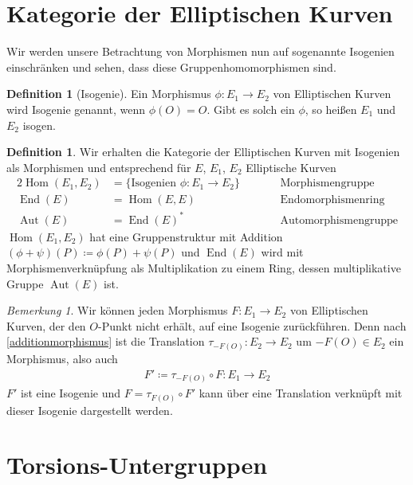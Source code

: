 \documentclass[english, german, parskip=half]{scrartcl}
\theoremstyle{definition}
\newtheorem{Definition}[Satz]{Definition}
\theoremstyle{remark}
\newtheorem{Bemerkung}[Satz]{Bemerkung}
\DeclareMathOperator{\Hom}{Hom}
\DeclareMathOperator{\End}{End}
\DeclareMathOperator{\Aut}{Aut}
\begin{document}



\section{Kategorie der Elliptischen Kurven}
Wir werden unsere Betrachtung von Morphismen nun auf sogenannte
Isogenien einschränken und sehen, dass diese Gruppenhomomorphismen
sind.

\begin{Definition}[Isogenie]
  Ein Morphismus $\phi\colon E_1\to E_2$ von Elliptischen Kurven wird
  Isogenie genannt, wenn $\phi(O)=O$.
  Gibt es solch ein $\phi$, so heißen $E_1$ und $E_2$ isogen.
\end{Definition}

\begin{Definition}
  Wir erhalten die Kategorie der Elliptischen Kurven mit Isogenien als
  Morphismen und entsprechend für $E$, $E_1$, $E_2$ Elliptische Kurven
  \begin{alignat*}{2}
    \Hom(E_1, E_2)&=\{\text{Isogenien }\phi\colon E_1\to E_2\}
    \qquad&&\text{Morphismengruppe}
    \\
    \End(E)&=\Hom(E,E)
    &&\text{Endomorphismenring}\\
    \Aut(E)&=\End(E)^*
    &&\text{Automorphismengruppe} 
  \end{alignat*}
  $\Hom(E_1, E_2)$ hat eine Gruppenstruktur mit Addition
  $(\phi+\psi)(P)\coloneqq \phi(P)+\psi(P)$ 
  und $\End(E)$ wird mit Morphismenverknüpfung als Multiplikation zu 
  einem Ring, dessen multiplikative Gruppe $\Aut(E)$ ist.
\end{Definition}

\begin{Bemerkung}
Wir können jeden Morphismus $F\colon E_1\to E_2$ von Elliptischen
Kurven, der den $O$-Punkt nicht erhält, auf eine Isogenie
zurückführen.
Denn nach \autoref{additionmorphismus} ist die Translation
$\tau_{-F(O)}\colon E_2\to E_2$ um $-F(O)\in E_2$
ein Morphismus, also auch 
\begin{gather*}
  F'\coloneqq\tau_{-F(O)}\circ F\colon E_1\to E_2
\end{gather*}
$F'$ ist eine Isogenie und $F=\tau_{F(O)}\circ F'$ kann über
eine Translation verknüpft mit dieser Isogenie dargestellt werden.
\end{Bemerkung}

\section{Torsions-Untergruppen}
\end{document}
